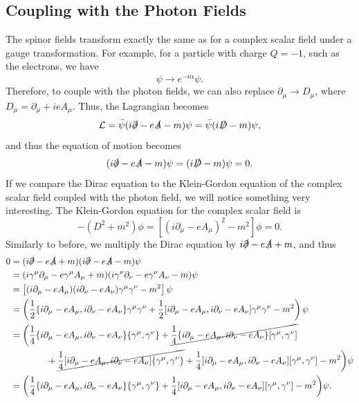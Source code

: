 \documentclass[11pt]{article}
\theoremstyle{definition}
\begin{document}
\subsection{Coupling with the Photon Fields}
The spinor fields transform exactly the same as for a complex scalar field under a gauge transformation. For example, for a particle with charge $Q=-1$, such as the electrons, we have
\begin{equation}
    \psi \rightarrow e^{-i\alpha}\psi.
\end{equation}
Therefore, to couple with the photon fields, we can also replace $\partial_\mu \rightarrow D_\mu$, where $D_\mu = \partial_\mu +ieA_\mu$. Thus, the Lagrangian becomes
\begin{equation}
    \mathcal{L} = \bar{\psi}(i\slashed{\partial}-e\slashed{A}-m)\psi = \bar{\psi}(i\slashed{D}-m)\psi,
\end{equation}
and thus the equation of motion becomes
\begin{equation}
    (i\slashed{\partial}-e\slashed{A}-m)\psi = (i\slashed{D}-m)\psi = 0.
\end{equation}
If we compare the Dirac equation to the Klein-Gordon equation of the complex scalar field coupled with the photon field, we will notice something very interesting. The Klein-Gordon equation for the complex scalar field is
\begin{equation}
    -(D^2+m^2)\phi = [(i\partial_\mu-eA_\mu)^2-m^2]\phi = 0.
    \label{Eq. scalar QED}
\end{equation}
Similarly to before, we multiply the Dirac equation by $i\slashed{\partial}-e\slashed{A}+m$, and thus
\begin{equation}
    \begin{aligned}
        0 &= (i\slashed{\partial}-e\slashed{A}+m)(i\slashed{\partial}-e\slashed{A}-m)\psi\\
        &= (i\gamma^\mu\partial_\mu - e\gamma^\mu A_\mu +m)(i\gamma^\nu\partial_\nu - e\gamma^\nu A_\nu -m)\psi\\
        &= \left[(i\partial_\mu - eA_\mu)(i\partial_\nu - eA_\nu)\gamma^\mu\gamma^\nu - m^2\right]\psi\\
        &= \left( \frac{1}{2}\{i\partial_\mu - eA_\mu,i\partial_\nu - eA_\nu\}\gamma^\mu\gamma^\nu  + \frac{1}{2}[i\partial_\mu - eA_\mu,i\partial_\nu - eA_\nu]\gamma^\mu\gamma^\nu -m^2 \right)\psi \\
        &= \bigg( \frac{1}{4}\{i\partial_\mu - eA_\mu,i\partial_\nu - eA_\nu\}\{\gamma^\mu,\gamma^\nu\} +  \cancel{\frac{1}{4}\{i\partial_\mu - eA_\mu,i\partial_\nu - eA_\nu\}[\gamma^\mu,\gamma^\nu]} \\
        & \qquad \qquad + \cancel{\frac{1}{4}[i\partial_\mu - eA_\mu,i\partial_\nu - eA_\nu]\{\gamma^\mu,\gamma^\nu\}} + \frac{1}{4}[i\partial_\mu - eA_\mu,i\partial_\nu - eA_\nu][\gamma^\mu,\gamma^\nu] -m^2 \bigg)\psi\\
        &= \bigg( \frac{1}{4}\{i\partial_\mu - eA_\mu,i\partial_\nu - eA_\nu\}\{\gamma^\mu,\gamma^\nu\} + \frac{1}{4}[i\partial_\mu - eA_\mu,i\partial_\nu - eA_\nu][\gamma^\mu,\gamma^\nu] -m^2 \bigg)\psi.
    \end{aligned}
\end{equation}
\end{document}
